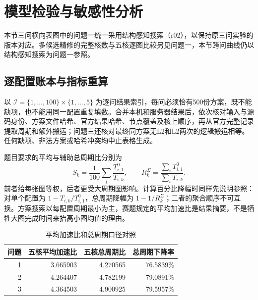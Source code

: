 \section{模型检验与敏感性分析}
本节三问横向表图中的问题一统一采用结构感知搜索（r02），以保持原三问实验的版本对应。多候选精修的完整核数与五核逐图比较另见问题一，本节跨问曲线仍以结构感知搜索为问题一参照。
\subsection{逐配置账本与指标重算}
以 $\mathcal I=\{1,\ldots,100\}\times\{1,\ldots,5\}$ 为逐问结果索引，每问必须恰有500份方案，既不能缺项，也不能用同一配置重复填数。合并本机和服务器结果后，依次核对输入与源码身份、方案文件哈希、官方结果哈希、节点覆盖及核上顺序，再从官方完整记录提取周期和额外搬运；问题三还核对最终同方案无L2和L2两次的逻辑搬运相等。任何缺项、非法方案或哈希冲突均中止表格生成。

题目要求的平均与辅助总周期比分别为
\begin{equation}\label{eq:validation-vector-mean}
\overline S_k=\frac1{100}\sum_i\frac{T^0_{i,1}}{T_{i,k}},\qquad
R_k^\Sigma=\frac{\sum_iT^0_{i,1}}{\sum_iT_{i,k}}.
\end{equation}
前者给每张图等权，后者更受大周期图影响。计算百分比降幅时同样先说明参照：对单个配置为 $1-T_{i,k}/T^0_{i,1}$，总周期降幅为 $1-1/R_k^\Sigma$；二者的聚合顺序不可互换。方案搜索以每配置周期最小为主，赛题规定的平均加速比是结果摘要，不是牺牲大图完成时间来抬高小图均值的理由。
\begin{table}[!htbp]\centering\small
\caption{平均加速比和总周期口径对照}\label{tab:metric-perspective}
\begin{tabular}{rrrr}
\toprule
问题 & 五核平均加速比 & 五核总周期比 & 总周期下降率\\
\midrule
1 & 3.665903 & 4.270565 & 76.5839\%\\
2 & 4.264407 & 4.782199 & 79.0891\%\\
3 & 4.364503 & 4.900925 & 79.5957\%\\
\bottomrule
\end{tabular}
\end{table}
